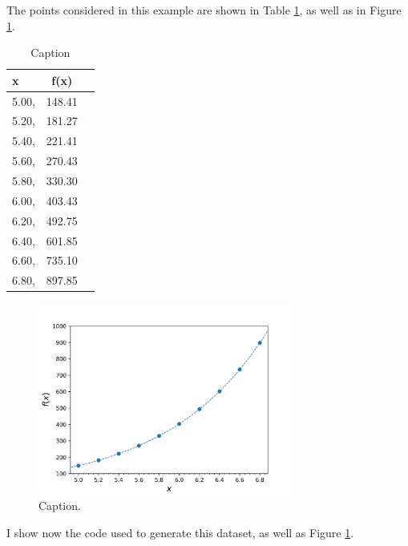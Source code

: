 \documentclass{article}%
\begin{document}
The points considered in this example are shown in Table \ref{tab:dataset}, as well as in Figure \ref{fig:Fig1}.

\begin{table}[h!]
	\begin{center}
		\caption{Caption}
		\label{tab:dataset}
		\begin{tabular}{l|c|r} %
			\textbf{x} & \textbf{f(x)}\\
			\hline
				5.00, & 148.41\\
				5.20, & 181.27\\
				5.40, & 221.41\\
				5.60, & 270.43\\
				5.80, & 330.30\\
				6.00, & 403.43\\
				6.20, & 492.75\\
				6.40, & 601.85\\
				6.60, & 735.10\\
				6.80, & 897.85\\
		\end{tabular}
	\end{center}
\end{table}

\begin{figure}[!htbp]
	\centering
	\includegraphics[width=0.75\textwidth]{figures/Fig1.png}
	\caption{Caption.}
	\label{fig:Fig1}
\end{figure}

I show now the code used to generate this dataset, as well as Figure \ref{fig:Fig1}.
\end{document}
